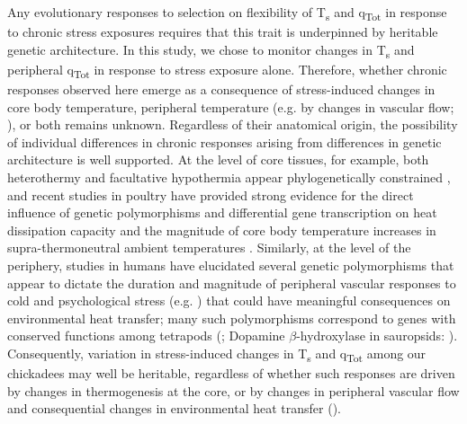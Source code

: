 \documentclass[12pt]{article}
\begin{document}
\noindent Any evolutionary responses to selection on flexibility of T\textsubscript{s} and q\textsubscript{Tot} in response to chronic stress exposures requires that this trait is underpinned by heritable genetic architecture. In this study, we chose to monitor changes in T\textsubscript{s} and peripheral q\textsubscript{Tot} in response to stress exposure alone. Therefore, whether chronic responses observed here emerge as a consequence of stress-induced changes in core body temperature, peripheral temperature (e.g. by changes in vascular flow; \citealt{oka_2001}), or both remains unknown. Regardless of their anatomical origin, the possibility of individual differences in chronic responses arising from differences in genetic architecture is well supported. At the level of core tissues, for example, both heterothermy and facultative hypothermia appear phylogenetically constrained \citep{boyles_2013,gerson_2019}, and recent studies in poultry have provided strong evidence for the direct influence of genetic polymorphisms and differential gene transcription on heat dissipation capacity and the magnitude of core body temperature increases in supra-thermoneutral ambient temperatures \citep{srikanth_2019,zhuang_2019}. Similarly, at the level of the periphery, studies in humans have elucidated several genetic polymorphisms that appear to dictate the duration and magnitude of peripheral vascular responses to cold and psychological stress (e.g. \citealt{rao_2008,chen_2010,kelsey_2010,kelsey_2012,huang_2012}) that could have meaningful consequences on environmental heat transfer; many such polymorphisms correspond to genes with conserved functions among tetrapods (\citealt{vincent_1998,yamamoto_2011,cespedes_2017}; Dopamine $\beta$-hydroxylase in sauropsids: \citealt{lovell_2015}). Consequently, variation in stress-induced changes in T\textsubscript{s} and q\textsubscript{Tot} among our chickadees may well be heritable, regardless of whether such responses are driven by changes in thermogenesis at the core, or by changes in peripheral vascular flow and consequential changes in environmental heat transfer (\citealt{robertson_2020a}). \vspace{1cm}
\end{document}
